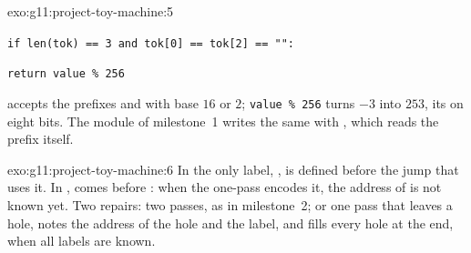 \begin{solution}{exo:g11:project-toy-machine:5}
\smallskip\noindent\hspace*{2em}

\noindent\hspace*{4em}

\noindent\hspace*{4em}\texttt{if len(tok) == 3 and tok[0] == tok[2] == "\textquotesingle{}":}

\noindent\hspace*{6em}

\noindent\hspace*{4em}

\noindent\hspace*{6em}

\noindent\hspace*{4em}

\noindent\hspace*{6em}

\noindent\hspace*{4em}

\noindent\hspace*{6em}

\noindent\hspace*{4em}

\noindent\hspace*{6em}

\noindent\hspace*{4em}\texttt{return value \% 256}

\smallskip\noindent {} accepts the prefixes  and  with base $16$ or $2$; \texttt{value \% 256}
turns $-3$ into $253$, its  on eight bits. The module of milestone~1 writes the same with
, which reads the prefix itself.
\end{solution}

\begin{solution}{exo:g11:project-toy-machine:6}
In  the only label, , is defined before the jump that uses it. In
,  comes before : when the one-pass  encodes it, the address of
 is not known yet. Two repairs: two passes, as in milestone~2; or one pass that leaves a hole, notes the
address of the hole and the label, and fills every hole at the end, when all labels are known.
\end{solution}

